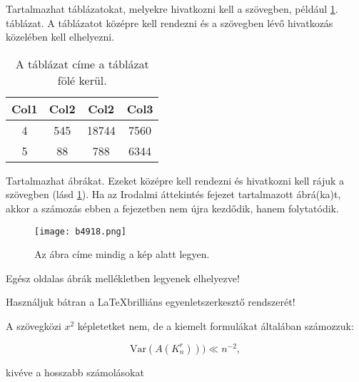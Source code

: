 \documentclass[a4paper,12pt]{report}
\theoremstyle{definition}
\theoremstyle{remark}
\begin{document}
Tartalmazhat táblázatokat, melyekre hivatkozni kell a szövegben, például \ref{table:2}. táblázat. A táblázatot középre kell rendezni és a szövegben lévő hivatkozás közelében kell elhelyezni.

\begin{table}[h!]
\centering
\caption{A táblázat címe a táblázat fölé kerül.}
\label{table:2}
\vspace{.2 cm}
\begin{tabular}{||c c c c||} 
 \hline
 Col1 & Col2 & Col2 & Col3 \\ [0.5ex] 
 \hline\hline
  4 & 545 & 18744 & 7560 \\
 5 & 88 & 788 & 6344 \\ [1ex] 
 \hline
\end{tabular}
\end{table}




Tartalmazhat ábrákat. Ezeket középre kell rendezni és hivatkozni kell rájuk a szövegben (lásd \ref{fig:korokuj}). Ha az Irodalmi áttekintés fejezet tartalmazott ábrá(ka)t, akkor a számozás ebben a fejezetben nem újra kezdődik, hanem folytatódik.

\begin{figure}
\centering
\texttt{[image: b4918.png]}
\caption{ \label{fig:korokuj} Az ábra címe mindig a kép alatt legyen.
}
\end{figure}

Egész oldalas ábrák mellékletben legyenek elhelyezve!

Használjuk bátran a \LaTeX  brilliáns egyenletszerkesztő rendszerét!

A szövegközi $x^2$ képletetket nem, de a kiemelt formulákat általában számozzuk:

 \begin{equation}\label{circle-area}
\mathrm{Var} (A(K_n^r)))\ll n^{-2},
\end{equation}

kivéve a hosszabb számolásokat
\end{document}
